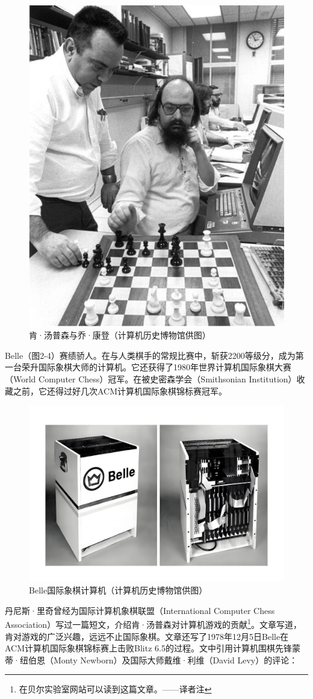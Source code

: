 \documentclass[a4paper,12pt,UTF8,twoside]{ctexbook}
\begin{document}
\begin{figure}[htbp]
	\centering
	\includegraphics[width=0.7\linewidth]{15}
	\caption{肯·汤普森与乔·康登（计算机历史博物馆供图）}
	\label{fig:1}
\end{figure}

Belle（图2-4）赛绩骄人。在与人类棋手的常规比赛中，斩获2200等级分，成为第一台荣升国际象棋大师的计算机。它还获得了1980年世界计算机国际象棋大赛（World Computer Chess）冠军。在被史密森学会（Smithsonian Institution）收藏之前，它还得过好几次ACM计算机国际象棋锦标赛冠军。

\begin{figure}[htbp]
	\centering
	\includegraphics[width=0.7\linewidth]{16}
	\caption{Belle国际象棋计算机（计算机历史博物馆供图）}
	\label{fig:1}
\end{figure}

丹尼斯·里奇曾经为国际计算机象棋联盟（International Computer Chess Association）写过一篇短文，介绍肯·汤普森对计算机游戏的贡献\footnote{在贝尔实验室网站可以读到这篇文章。——译者注}。文章写道，肯对游戏的广泛兴趣，远远不止国际象棋。文章还写了1978年12月5日Belle在ACM计算机国际象棋锦标赛上击败Blitz 6.5的过程。文中引用计算机围棋先锋蒙蒂·纽伯恩（Monty Newborn）及国际大师戴维·利维（David Levy）的评论：
\end{document}
